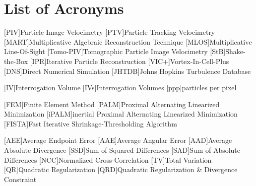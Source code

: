 
\chapter*{List of Acronyms}
\label{chap:acronyms}

\begin{acronym}
[PIV]{Particle Image Velocimetry}
[PTV]{Particle Tracking Velocimetry}
[MART]{Multiplicative Algebraic Reconstruction Technique}
[MLOS]{Multiplicative Line-Of-Sight}
[Tomo-PIV]{Tomographic Particle Image Velocimetry}
[StB]{Shake-the-Box}
[IPR]{Iterative Particle Reconstruction}
[VIC+]{Vortex-In-Cell-Plus}
[DNS]{Direct Numerical Simulation}
[JHTDB]{Johns Hopkins Turbulence Database}


[IV]{Interrogation Volume}
[IVs]{Interrogation Volumes}
[ppp]{particles per pixel}


[FEM]{Finite Element Method}
[PALM]{Proximal Alternating Linearized Minimization}
[iPALM]{inertial Proximal Alternating Linearized Minimization}
[FISTA]{Fast Iterative Shrinkage-Thresholding Algorithm}


[AEE]{Average Endpoint Error}
[AAE]{Average Angular Error}
[AAD]{Average Absolute Divergence}
[SSD]{Sum of Squared Differences}
[SAD]{Sum of Absolute Differences}
[NCC]{Normalized Cross-Correlation}
[TV]{Total Variation}
[QR]{Quadratic Regularization}
[QRD]{Quadratic Regularization \& Divergence Constraint} %
\end{acronym}